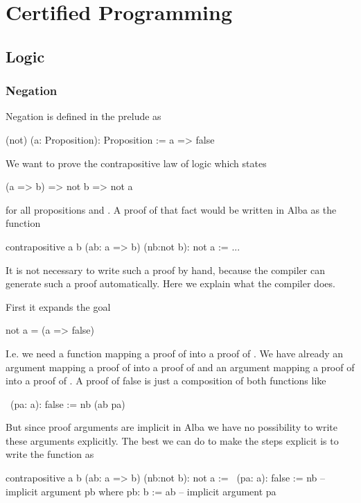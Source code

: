 
\chapter{Certified Programming}
\label{chap:certprog}





\newpage
\section{Logic}
\label{sec:certprog-logic}


\subsection{Negation}

Negation is defined in the prelude as
\begin{alba}
  (not) (a: Proposition): Proposition :=
    a => false
\end{alba}

We want to prove the contrapositive law of logic which states
\begin{alba}
  (a => b) => not b => not a
\end{alba}
for all propositions  and . A proof of that fact would be
written in Alba as the function
%
\begin{alba}
  contrapositive a b (ab: a => b) (nb:not b): not a :=
    ...
\end{alba}
%
It is not necessary to write such a proof by hand, because the compiler can
generate such a proof automatically. Here we explain what the compiler does.

First it expands the goal
\begin{alba}
  not a   =  (a => false)
\end{alba}
I.e. we need a function mapping a proof of  into a proof of
. We have already an argument  mapping a proof of
 into a proof of  and an argument  mapping a
proof of  into a proof of . A proof of false is just a
composition of both functions like
%
\begin{alba}
  \ (pa: a): false := nb (ab pa)
\end{alba}
%
But since proof arguments are implicit in Alba we have no possibility to write
these arguments explicitly. The best we can do to make the steps explicit is
to write the function as
%
\begin{alba}
  contrapositive a b (ab: a => b) (nb:not b): not a :=
    \ (pa: a): false :=
      nb               -- implicit argument pb
      where
        pb: b := ab    -- implicit argument pa
\end{alba}
%




